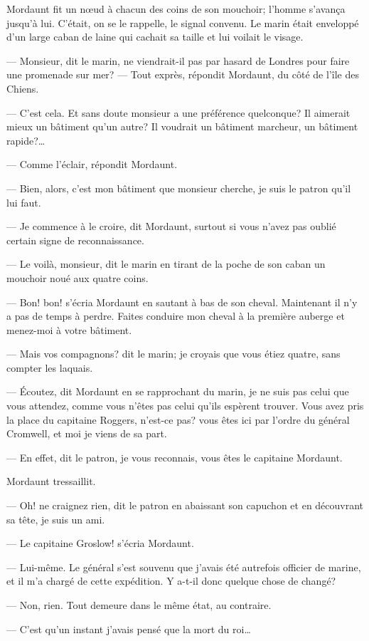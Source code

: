 Mordaunt fit un nœud à chacun des coins de son mouchoir; l'homme s'avança jusqu'à lui. C'était, on se le rappelle, le signal convenu. Le marin était enveloppé d'un large caban de laine qui cachait sa taille et lui voilait le visage.

— Monsieur, dit le marin, ne viendrait-il pas par hasard de Londres pour faire une promenade sur mer?
— Tout exprès, répondit Mordaunt, du côté de l'île des Chiens.

— C'est cela. Et sans doute monsieur a une préférence quelconque? Il aimerait mieux un bâtiment qu'un autre? Il voudrait un bâtiment marcheur, un bâtiment rapide?\dots

— Comme l'éclair, répondit Mordaunt.

— Bien, alors, c'est mon bâtiment que monsieur cherche, je suis le patron qu'il lui faut.

— Je commence à le croire, dit Mordaunt, surtout si vous n'avez pas oublié certain signe de reconnaissance.

— Le voilà, monsieur, dit le marin en tirant de la poche de son caban un mouchoir noué aux quatre coins.

— Bon! bon! s'écria Mordaunt en sautant à bas de son cheval. Maintenant il n'y a pas de temps à perdre. Faites conduire mon cheval à la première auberge et menez-moi à votre bâtiment.

— Mais vos compagnons? dit le marin; je croyais que vous étiez quatre, sans compter les laquais.

— Écoutez, dit Mordaunt en se rapprochant du marin, je ne suis pas celui que vous attendez, comme vous n'êtes pas celui qu'ils espèrent trouver. Vous avez pris la place du capitaine Roggers, n'est-ce pas? vous êtes ici par l'ordre du général Cromwell, et moi je viens de sa part.

— En effet, dit le patron, je vous reconnais, vous êtes le capitaine Mordaunt.

Mordaunt tressaillit.

— Oh! ne craignez rien, dit le patron en abaissant son capuchon et en découvrant sa tête, je suis un ami.

— Le capitaine Groslow! s'écria Mordaunt.

— Lui-même. Le général s'est souvenu que j'avais été autrefois officier de marine, et il m'a chargé de cette expédition. Y a-t-il donc quelque chose de changé?

— Non, rien. Tout demeure dans le même état, au contraire.

— C'est qu'un instant j'avais pensé que la mort du roi\dots

